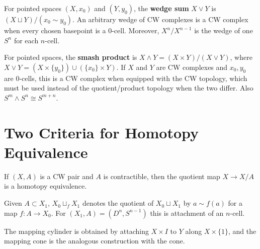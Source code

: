 \begin{definition}
\label{def:wedge-sum}
\leanok
{}
For pointed spaces $(X,x_0)$ and $(Y,y_0)$, the \textbf{wedge sum} $X\vee Y$ is
$(X\sqcup Y)/(x_0\sim y_0)$. An arbitrary wedge of CW complexes is a CW complex
when every chosen basepoint is a $0$-cell. Moreover, $X^n/X^{n-1}$ is the wedge of
one $S^n$ for each $n$-cell.
\end{definition}

\begin{definition}
\label{def:smash-product}
\leanok
{}
For pointed spaces, the \textbf{smash product} is
$X\wedge Y=(X\times Y)/(X\vee Y)$, where
$X\vee Y=(X\times\{y_0\})\cup(\{x_0\}\times Y)$. If $X$ and $Y$ are CW
complexes and $x_0,y_0$ are $0$-cells, this is a CW complex when equipped with
the CW topology, which must be used instead of the quotient/product topology
when the two differ. Also $S^m\wedge S^n\cong S^{m+n}$.
\end{definition}

\section{Two Criteria for Homotopy Equivalence}
\label{sec:two-criteria-homotopy-equivalence}

\begin{proposition}
\label{prop:collapsing-contractible-cw-subcomplex}
\leanok
{}
If $(X,A)$ is a CW pair and $A$ is contractible, then the quotient map
$X\to X/A$ is a homotopy equivalence.
\end{proposition}

\begin{definition}
\label{def:attaching-space}
\leanok
Given $A\subset X_1$, $X_0\sqcup_fX_1$ denotes the quotient of $X_0\sqcup X_1$
by $a\sim f(a)$ for a map $f:A\to X_0$. For $(X_1,A)=(D^n,S^{n-1})$ this is
attachment of an $n$-cell.
\end{definition}

The mapping cylinder is obtained by attaching $X\times I$ to $Y$ along
$X\times\{1\}$, and the mapping cone is the analogous construction with the cone.

